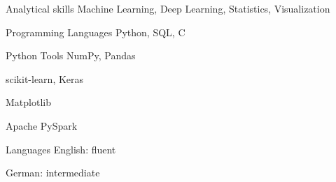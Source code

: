 
\begin{cvskills}



  \cvskill
    {Analytical skills} %
    {Machine Learning, Deep Learning, Statistics, Visualization} %

  \cvskill
    {Programming Languages} %
    {Python, SQL, C} %

  \cvskill
    {Python Tools} %
    {NumPy, Pandas} %
    
  \cvskill
    {} %
    {scikit-learn, Keras} 
    
  \cvskill
    {} %
    {Matplotlib}       
    
  \cvskill
    {} %
    {Apache PySpark}     
    
  \cvskill
    {Languages} %
    {English: fluent} %
    
  \cvskill
    {} %
    {German: intermediate} %
    
    
    
\end{cvskills}
